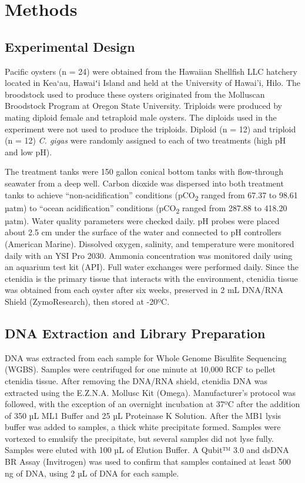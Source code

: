 \documentclass [11pt, proquest] {uwthesis}[2015/03/03]
\begin{document}
\hypertarget{methods-3}{%
\section{Methods}\label{methods-3}}

\hypertarget{experimental-design-1}{%
\subsection{Experimental Design}\label{experimental-design-1}}

Pacific oysters (n = 24) were obtained from the Hawaiian Shellfish LLC hatchery located in Kea`au, Hawaiʻi Island and held at the University of Hawai'i, Hilo. The broodstock used to produce these oysters originated from the Molluscan Broodstock Program at Oregon State University. Triploids were produced by mating diploid female and tetraploid male oysters. The diploids used in the experiment were not used to produce the triploids. Diploid (n = 12) and triploid (n = 12) \emph{C. gigas} were randomly assigned to each of two treatments (high pH and low pH).

The treatment tanks were 150 gallon conical bottom tanks with flow-through seawater from a deep well. Carbon dioxide was dispersed into both treatment tanks to achieve ``non-acidification'' conditions (pCO\textsubscript{2} ranged from 67.37 to 98.61 µatm) to ``ocean acidification'' conditions (pCO\textsubscript{2} ranged from 287.88 to 418.20 µatm). Water quality parameters were checked daily. pH probes were placed about 2.5 cm under the surface of the water and connected to pH controllers (American Marine). Dissolved oxygen, salinity, and temperature were monitored daily with an YSI Pro 2030. Ammonia concentration was monitored daily using an aquarium test kit (API). Full water exchanges were performed daily. Since the ctenidia is the primary tissue that interacts with the environment, ctenidia tissue was obtained from each oyster after six weeks, preserved in 2 mL DNA/RNA Shield (ZymoResearch), then stored at -20ºC.

\hypertarget{dna-extraction-and-library-preparation-1}{%
\subsection{DNA Extraction and Library Preparation}\label{dna-extraction-and-library-preparation-1}}

DNA was extracted from each sample for Whole Genome Bisulfite Sequencing (WGBS). Samples were centrifuged for one minute at 10,000 RCF to pellet ctenidia tissue. After removing the DNA/RNA shield, ctenidia DNA was extracted using the E.Z.N.A. Mollusc Kit (Omega). Manufacturer's protocol was followed, with the exception of an overnight incubation at 37ºC after the addition of 350 µL ML1 Buffer and 25 µL Proteinase K Solution. After the MB1 lysis buffer was added to samples, a thick white precipitate formed. Samples were vortexed to emulsify the precipitate, but several samples did not lyse fully. Samples were eluted with 100 µL of Elution Buffer. A Qubit™ 3.0 and dsDNA BR Assay (Invitrogen) was used to confirm that samples contained at least 500 ng of DNA, using 2 µL of DNA for each sample.
\end{document}
